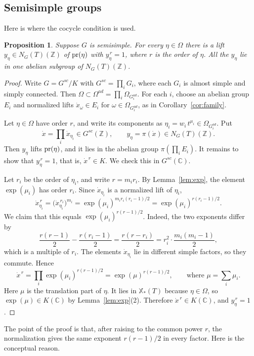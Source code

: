 \documentclass[psamsfonts]{amsart}
\newtheorem{prop}[thm]{Proposition}
\theoremstyle{definition}
\theoremstyle{remark}
\numberwithin{equation}{section}
\newcommand{\Z}{\mathbb{Z}}   %
\newcommand{\X}{\mathbb{X}}
\newcommand{\CC}{\mathbb{C}}
\numberwithin{equation}{section}
\newcommand{\om}{\omega}
\newcommand{\Om}{\Omega}
\newcommand\pr{\textup{pr}}
\theoremstyle{plain}
\begin{document}
\subsection{Semisimple groups}
Here is where the cocycle condition is used.

\begin{prop}\label{prop:semisimple}
Suppose $G$ is semisimple. For every $\eta\in\Om$ there is a lift $y_\eta\in N_G(T)(\Z)$ of $\pr(\eta)$ with $y_\eta^{\,r}=1$, where $r$ is the order of $\eta$. All the $y_\eta$ lie in one abelian subgroup of $N_G(T)(\Z)$.
\end{prop}

\begin{proof}
Write $G=G^{sc}/K$ with $G^{sc}=\prod_iG_i$, where each $G_i$ is almost simple and simply connected. Then $\Om\subset\Om^{ad}=\prod_i\Om_{G_i^{ad}}$. For each $i$, choose an abelian group $E_i$ and normalized lifts $\dot x_\om\in E_i$ for $\om\in\Om_{G_i^{ad}}$, as in Corollary~\ref{cor:family}.

Let $\eta\in\Om$ have order $r$, and write its components as $\eta_i=w_i\,t^{\mu_i}\in\Om_{G_i^{ad}}$. Put
\[
\dot x=\prod_i\dot x_{\eta_i}\in G^{sc}(\Z),\qquad y_\eta=\pi(\dot x)\in N_G(T)(\Z).
\]
Then $y_\eta$ lifts $\pr(\eta)$, and it lies in the abelian group $\pi(\prod_iE_i)$. It remains to show that $y_\eta^{\,r}=1$, that is, $\dot x^{\,r}\in K$. We check this in $G^{sc}(\CC)$.

Let $r_i$ be the order of $\eta_i$, and write $r=m_ir_i$. By Lemma~\ref{lem:exp}, the element $\exp(\mu_i)$ has order $r_i$. Since $\dot x_{\eta_i}$ is a normalized lift of $\eta_i$,
\[
\dot x_{\eta_i}^{\,r}=\big(\dot x_{\eta_i}^{\,r_i}\big)^{m_i}=\exp(\mu_i)^{m_ir_i(r_i-1)/2}=\exp(\mu_i)^{r(r_i-1)/2}.
\]
We claim that this equals $\exp(\mu_i)^{r(r-1)/2}$. Indeed, the two exponents differ by
\[
\frac{r(r-1)}2-\frac{r(r_i-1)}2=\frac{r(r-r_i)}2=r_i^2\cdot\frac{m_i(m_i-1)}2,
\]
which is a multiple of $r_i$. The elements $\dot x_{\eta_i}$ lie in different simple factors, so they commute. Hence
\[
\dot x^{\,r}=\prod_i\exp(\mu_i)^{r(r-1)/2}=\exp(\mu)^{r(r-1)/2},\qquad\text{where }\mu=\sum_i\mu_i.
\]
Here $\mu$ is the translation part of $\eta$. It lies in $\X_*(T)$ because $\eta\in\Om$, so $\exp(\mu)\in K(\CC)$ by Lemma~\ref{lem:exp}(2). Therefore $\dot x^{\,r}\in K(\CC)$, and $y_\eta^{\,r}=1$.
\end{proof}

The point of the proof is that, after raising to the common power $r$, the normalization gives the same exponent $r(r-1)/2$ in every factor. Here is the conceptual reason.
\end{document}
